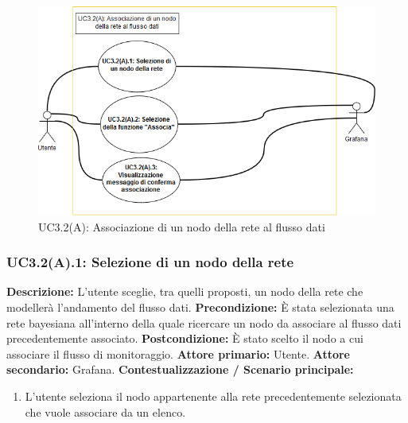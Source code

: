                     \begin{figure}[!htbp]
                    	\centering
                    	\includegraphics[width=\textwidth]{UC3-2(A).png}
                    	\caption{UC3.2(A): Associazione di un nodo della rete al flusso dati}
                    	\label{uc3.2a}
                    \end{figure}
                    
                \subsubsection{UC3.2(A).1: Selezione di un nodo della rete}
                    \textbf{Descrizione:} L’utente sceglie, tra quelli proposti, un nodo della rete che modellerà l'andamento del flusso dati.
                    \newline
                    \textbf{Precondizione:} \`E stata selezionata una rete bayesiana all'interno della quale ricercare un nodo da associare al flusso dati precedentemente associato.
                    \newline
                    \textbf{Postcondizione:} \`E stato scelto il nodo a cui associare il flusso di monitoraggio.
                    \newline
                    \textbf{Attore primario:} Utente.
                    \newline
                    \textbf{Attore secondario:} Grafana.
                    \newline
                    \textbf{Contestualizzazione / Scenario principale:} \begin{enumerate}
                        \item L’utente seleziona il nodo appartenente alla rete precedentemente selezionata che vuole associare da un elenco.
                    \end{enumerate}
                    
